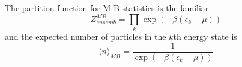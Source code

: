 The partition function for M-B statistics is the familiar
$$
	Z^{MB}_{ensemb} = \prod_k \exp(-\beta(\epsilon_k-\mu))
$$
and the expected number of particles in the $k$th energy state is
$$
\langle n\rangle_{MB} = \frac{1}{\exp(-\beta(\epsilon_k-\mu))}
$$






